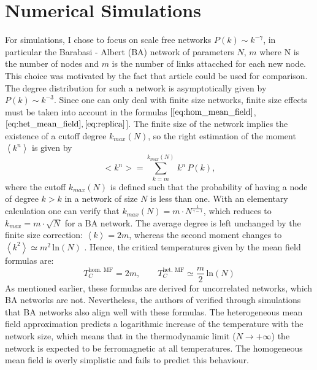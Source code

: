 \section{Numerical Simulations}
For simulations, I chose to focus on scale free networks $P(k) \sim k^{-\gamma}$, in particular the Barabasi - Albert (BA) network of parameters $N,\, m$ where N is the number of nodes and $m$ is the number of links attacched for each new node. This choice was motivated by the fact that article \cite{numeric_ising} could be used for comparison. The degree distribution for such a network is asymptotically given by $P(k) \sim k^{-3}$. Since one can only deal with finite size networks, finite size effects must be taken into account in the formulas $[\ref{eq:hom_mean_field}$, $\ref{eq:het_mean_field}, \ref{eq:replica}$].
The finite size of the network implies the existence of a cutoff degree $k_{max}(N)$, so the right estimation of the moment $\left\langle k^n \right \rangle$ is given by
\begin{equation*}
    <k^n> = \sum_{k=m}^{k_{max}(N)}\, k^n\,P(k),
\end{equation*}
where the cutoff $k_{max}(N)$ is defined such that the probability of having a node of degree $k>k$ in a network of size $N$ is less than one. With an elementary calculation one can verify that $k_{max}(N)= m\cdot N^{\frac{1}{\gamma -1}}$, which reduces to $k_{max} = m\cdot \sqrt{N}$ for a BA network.
The average degree is left unchanged by the finite size correction:  $\left \langle k \right \rangle = 2m$, whereas the second moment changes to $\left \langle k^2 \right \rangle \simeq m^2\,\text{ln}(N)$ \cite{analytical_ising}. Hence, the critical temperatures given by the mean field formulas are:
\begin{equation}
    T_C^{\text{hom. MF}} = 2m, \quad \quad T_C^{\text{het. MF}} \simeq \frac{m}{2}\,\text{ln}(N)
\end{equation}
As mentioned earlier, these formulas are derived for uncorrelated networks, which BA networks are not. Nevertheless, the authors of \cite{numeric_ising} verified through simulations that BA networks also align well with these formulas.
The heterogeneous mean field approximation predicts a logarithmic increase of the temperature with the network size, which means that in the thermodynamic limit ($N\rightarrow +\infty$) the network is expected to be ferromagnetic at all temperatures.
The homogeneous mean field is overly simplistic and fails to predict this behaviour. 
\bigskip \newline \noindent
